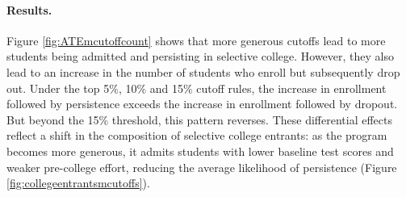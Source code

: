 \paragraph{Results.} Figure \ref{fig:ATEmcutoffcount} shows that more generous cutoffs lead to more students being admitted and persisting in selective college. However, they also lead to an increase in the number of students who enroll but subsequently drop out. Under the top 5\%, 10\% and 15\% cutoff rules, the increase in enrollment followed by persistence exceeds the increase in enrollment followed by dropout. But beyond the 15\% threshold, this pattern reverses. These differential effects reflect a shift in the composition of selective college entrants: as the program becomes more generous, it admits students with lower baseline test scores and weaker pre-college effort, reducing the average likelihood of persistence (Figure \ref{fig:collegeentrantsmcutoffs}).  \par 





